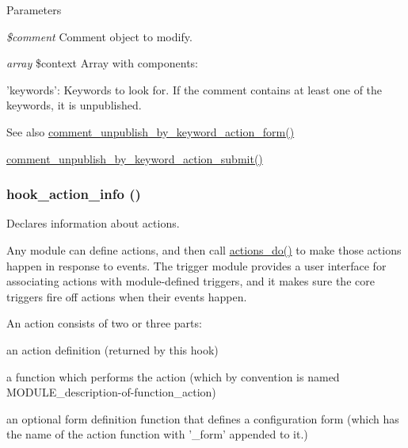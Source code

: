 \begin{DoxyParams}{Parameters}
\item[{\em \$comment}]Comment object to modify. \item[{\em array}]\$context Array with components:
\begin{DoxyItemize}
\item 'keywords': Keywords to look for. If the comment contains at least one of the keywords, it is unpublished.
\end{DoxyItemize}\end{DoxyParams}
\begin{DoxySeeAlso}{See also}
\hyperlink{group__forms_gad0012e675df965329fce2570a6be8f46}{comment\_\-unpublish\_\-by\_\-keyword\_\-action\_\-form()} 

\hyperlink{comment_8module_ad94091cb95aec2dd607bde68a07e0dd1}{comment\_\-unpublish\_\-by\_\-keyword\_\-action\_\-submit()} 
\end{DoxySeeAlso}
\hypertarget{group__actions_ga3df26c5d6496c91fcd0edd8648023fb4}{
\subsubsection[{hook\_\-action\_\-info}]{\setlength{\rightskip}{0pt plus 5cm}hook\_\-action\_\-info ()}}
\label{group__actions_ga3df26c5d6496c91fcd0edd8648023fb4}
Declares information about actions.

Any module can define actions, and then call \hyperlink{group__actions_gacfece93b3453da7c572057dde3453122}{actions\_\-do()} to make those actions happen in response to events. The trigger module provides a user interface for associating actions with module-\/defined triggers, and it makes sure the core triggers fire off actions when their events happen.

An action consists of two or three parts:
\begin{DoxyItemize}
\item an action definition (returned by this hook)
\item a function which performs the action (which by convention is named MODULE\_\-description-\/of-\/function\_\-action)
\item an optional form definition function that defines a configuration form (which has the name of the action function with '\_\-form' appended to it.)
\end{DoxyItemize}

